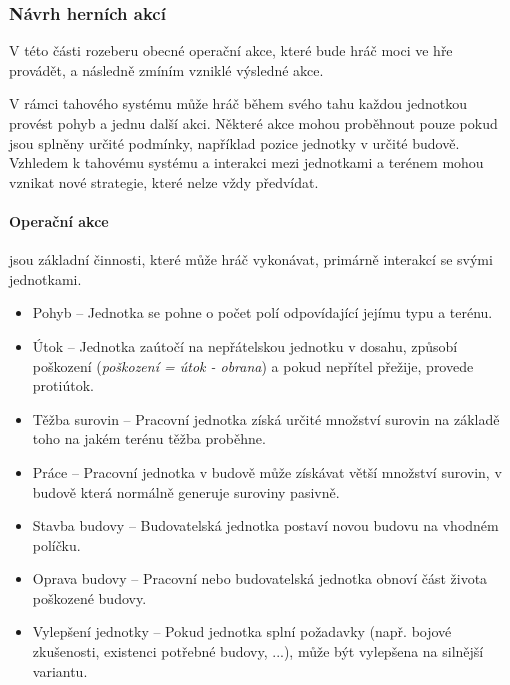 \subsubsection{Návrh herních akcí}

V této části rozeberu obecné operační akce, které bude hráč moci ve hře provádět, a následně zmíním vzniklé výsledné akce.

V rámci tahového systému může hráč během svého tahu každou jednotkou provést pohyb a jednu další akci. Některé akce mohou proběhnout pouze pokud jsou splněny určité podmínky, například pozice jednotky v určité budově. Vzhledem k tahovému systému a interakci mezi jednotkami a terénem mohou vznikat nové strategie, které nelze vždy předvídat.

\paragraph{Operační akce} jsou základní činnosti, které může hráč vykonávat, primárně interakcí se svými jednotkami.
\begin{itemize}
    \item Pohyb -- Jednotka se pohne o počet polí odpovídající jejímu typu a terénu.
    \item Útok -- Jednotka zaútočí na nepřátelskou jednotku v dosahu, způsobí poškození (\textit{poškození = útok - obrana}) a pokud nepřítel přežije, provede protiútok.
    \item Těžba surovin -- Pracovní jednotka získá určité množství surovin na základě toho na jakém terénu těžba proběhne.
    \item Práce -- Pracovní jednotka v budově může získávat větší množství surovin, v budově která normálně generuje suroviny pasivně.
    \item Stavba budovy -- Budovatelská jednotka postaví novou budovu na vhodném políčku.
    \item Oprava budovy -- Pracovní nebo budovatelská jednotka obnoví část života poškozené budovy.
    \item Vylepšení jednotky -- Pokud jednotka splní požadavky (např. bojové zkušenosti, existenci potřebné budovy, ...), může být vylepšena na silnější variantu.
\end{itemize}


